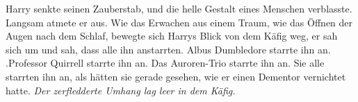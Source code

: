 Harry senkte seinen Zauberstab, und die helle Gestalt eines Menschen verblasste.
Langsam atmete er aus. Wie das Erwachen aus einem Traum, wie das Öffnen der
Augen nach dem Schlaf, bewegte sich Harrys Blick von dem Käfig weg, er sah sich
um und sah, dass alle ihn anstarrten. Albus Dumbledore starrte ihn an.
\grqq{}.Professor Quirrell starrte ihn an. Das Auroren-Trio starrte ihn an. Sie
alle starrten ihn an, als hätten sie gerade gesehen, wie er einen Dementor
vernichtet hatte. \emph{Der zerfledderte Umhang lag leer in dem Käfig.}

